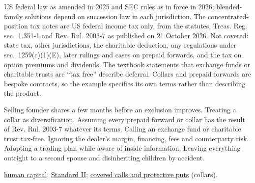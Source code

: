 \begin{qfmethod}
 US federal law as amended in 2025 and SEC rules as in force in 2026; blended-family solutions depend on succession law in each jurisdiction. The concentrated-position tax notes are US federal income tax only, from the statutes, Treas. Reg. sec.~1.351-1 and Rev. Rul. 2003-7 as published on 21 October 2026. Not covered: state tax, other jurisdictions, the charitable deduction, any regulations under sec.~1259(c)(1)(E), later rulings and cases on prepaid forwards, and the tax on option premiums and dividends. The textbook statements that exchange funds or charitable trusts are ``tax free'' describe deferral. Collars and prepaid forwards are bespoke contracts, so the example specifies its own terms rather than describing the product.

 Selling founder shares a few months before an exclusion improves. Treating a collar as diversification. Assuming every prepaid forward or collar has the result of Rev. Rul. 2003-7 whatever its terms. Calling an exchange fund or charitable trust tax-free. Ignoring the dealer's margin, financing, fees and counterparty risk. Adopting a trading plan while aware of inside information. Leaving everything outright to a second spouse and disinheriting children by accident.

 \hyperref[meth:human-capital-risks]{human capital}; \hyperref[rule:standard-market-integrity]{Standard II}; \hyperref[meth:covered-call-protective-put]{covered calls and protective puts} (collars).

\end{qfmethod}

